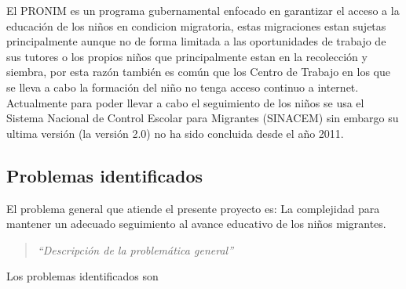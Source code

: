El PRONIM es un programa gubernamental enfocado en garantizar el acceso a la educación de los niños en condicion migratoria, estas migraciones estan sujetas principalmente aunque no de forma limitada a las oportunidades de trabajo de sus tutores o los propios niños que principalmente estan en la recolección y siembra, por esta razón también es común que los Centro de Trabajo en los que se lleva a cabo la formación del niño no tenga acceso continuo a internet.\\
Actualmente para poder llevar a cabo el seguimiento de los niños se usa el Sistema Nacional de Control Escolar para Migrantes (SINACEM) sin embargo su ultima versión (la versión 2.0) no ha sido concluida desde el año 2011.
\subsection{Problemas identificados}

El problema general que atiende el presente proyecto es: 
La complejidad para mantener un adecuado seguimiento al avance educativo de los niños migrantes.
\begin{quotation}
	{\em ``Descripción de la problemática general''}
\end{quotation}

Los problemas identificados son\FootnotePrioridad


